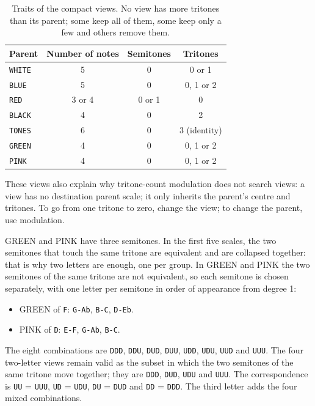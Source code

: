 \documentclass[]{report}
\begin{document}
\begin{table}[H]
	\centering
	\begin{tabular}{lccc}
		\toprule
		Parent & Number of notes & Semitones & Tritones \\
		\midrule
		\texttt{WHITE} & 5 & 0 & 0 or 1 \\
		\texttt{BLUE}  & 5 & 0 & 0, 1 or 2 \\
		\texttt{RED}   & 3 or 4 & 0 or 1 & 0 \\
		\texttt{BLACK} & 4 & 0 & 2 \\
		\texttt{TONES} & 6 & 0 & 3 (identity) \\
		\texttt{GREEN} & 4 & 0 & 0, 1 or 2 \\
		\texttt{PINK}  & 4 & 0 & 0, 1 or 2 \\
		\bottomrule
	\end{tabular}
	\caption{Traits of the compact views. No view has more tritones than its
	parent; some keep all of them, some keep only a few and others remove them.}
	\label{tab:collapse-view-traits-en}
\end{table}

These views also explain why tritone-count modulation does not search views: a
view has no destination parent scale; it only inherits the parent's centre and
tritones. To go from one tritone to zero, change the view; to change the
parent, use modulation.

\textsf{GREEN} and \textsf{PINK} have three semitones. In the
first five scales, the two semitones that touch the same tritone are equivalent
and are collapsed together: that is
why two letters are enough, one per group. In \textsf{GREEN} and \textsf{PINK}
the two semitones of the same tritone are not equivalent, so each semitone is
chosen separately, with one letter per semitone in order of appearance from
degree 1:

\begin{itemize}
	\item \textsf{GREEN} of \texttt{F}: \texttt{G-Ab}, \texttt{B-C},
	\texttt{D-Eb}.
	\item \textsf{PINK} of \texttt{D}: \texttt{E-F}, \texttt{G-Ab},
	\texttt{B-C}.
\end{itemize}

The eight combinations are \texttt{DDD}, \texttt{DDU}, \texttt{DUD},
\texttt{DUU}, \texttt{UDD}, \texttt{UDU}, \texttt{UUD} and \texttt{UUU}. The
four two-letter views remain valid as the subset in which the two semitones of
the same tritone move together; they are \texttt{DDD}, \texttt{DUD},
\texttt{UDU} and \texttt{UUU}. The correspondence is \texttt{UU} = \texttt{UUU},
\texttt{UD} = \texttt{UDU}, \texttt{DU} = \texttt{DUD} and \texttt{DD} =
\texttt{DDD}. The third letter adds the four mixed combinations.
\end{document}
